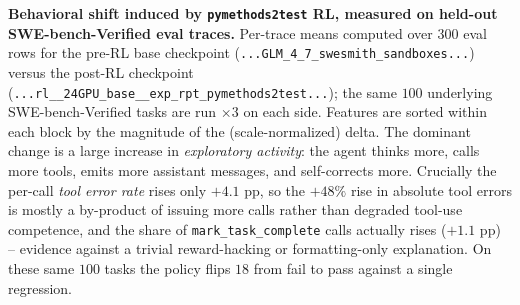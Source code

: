 \begin{table}[t!]
\caption{\textbf{Behavioral shift induced by \texttt{pymethods2test} RL, measured on held-out SWE-bench-Verified eval traces.}
Per-trace means computed over $300$ eval rows for the pre-RL base checkpoint
(\texttt{...GLM\_4\_7\_swesmith\_sandboxes...}) versus the post-RL checkpoint
(\texttt{...rl\_\_24GPU\_base\_\_exp\_rpt\_pymethods2test...}); the same $100$ underlying
SWE-bench-Verified tasks are run $\times 3$ on each side. Features are sorted within each
block by the magnitude of the (scale-normalized) delta. The dominant change is a large
increase in \emph{exploratory activity}: the agent thinks more, calls more tools, emits
more assistant messages, and self-corrects more. Crucially the per-call \emph{tool error
rate} rises only $+4.1$ pp, so the $+48\%$ rise in absolute tool errors is mostly a
by-product of issuing more calls rather than degraded tool-use competence, and the share of
\texttt{mark\_task\_complete} calls actually rises ($+1.1$ pp) -- evidence against a
trivial reward-hacking or formatting-only explanation. On these same $100$ tasks the policy
flips $18$ from fail to pass against a single regression.}
\label{tab:rl_behavior_shift}
\end{table}
